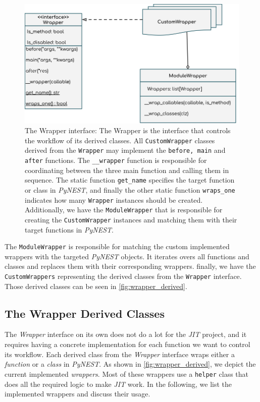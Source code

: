 \begin{figure}[ht!]
\centering
\includegraphics[width=\textwidth,height=\textheight,keepaspectratio]{src/pic/wrapper_uml.png}
\caption{The Wrapper interface: The Wrapper is the interface that controls the workflow of its derived classes. All \texttt{CustomWrapper} classes derived from the \texttt{Wrapper} may implement the \texttt{before, main} and \texttt{after} functions. The \texttt{__wrapper} function is responsible for coordinating between the three main function and calling them in sequence. The static function \texttt{get_name} specifies the target function or class in \emph{PyNEST}, and finally the other static function \texttt{wraps_one} indicates how many \texttt{Wrapper} instances should be created. Additionally, we have the \texttt{ModuleWrapper} that is responsible for creating the \texttt{CustomWrapper} instances and matching them with their target functions in \emph{PyNEST}.}
\label{fig:wrapper_uml}
\end{figure}

The \texttt{ModuleWrapper} is responsible for matching the custom implemented wrappers with the targeted \emph{PyNEST} objects. It iterates overs all functions and classes and replaces them with their corresponding wrappers. finally, we have the \texttt{CustomWrappers} representing the derived classes from the \texttt{Wrapper} interface. Those derived classes can be seen in \autoref{fig:wrapper_derived}.

\subsection{The Wrapper Derived Classes}

The \emph{Wrapper} interface on its own does not do a lot for the \emph{JIT} project, and it requires having a concrete implementation for each function we want to control its workflow. Each derived class from the \emph{Wrapper} interface wraps either a \emph{function} or a \emph{class} in \emph{PyNEST}. As shown in \autoref{fig:wrapper_derived}, we depict the current implemented \emph{wrappers}. Most of these wrappers use a \texttt{helper} class that does all the required logic to make \emph{JIT} work. In the following, we list the implemented wrappers and discuss their usage.

